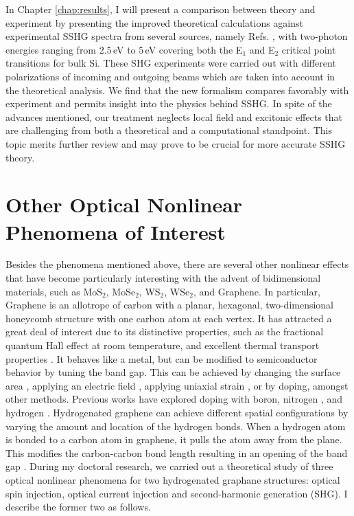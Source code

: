 In Chapter \ref{chap:results}, I will present a comparison between theory and
experiment by presenting the improved theoretical calculations against
experimental SSHG spectra from several sources, namely Refs. \cite{hoferAPA96,
bergfeldPRL04, mejiaPRB02, mitchellSS01}, with two-photon energies ranging from
2.5\,eV to 5\,eV covering both the E$_{1}$ and E$_{2}$ critical point
transitions for bulk Si. These SHG experiments were carried out with different
polarizations of incoming and outgoing beams which are taken into account in the
theoretical analysis. We find that the new formalism compares favorably with
experiment and permits insight into the physics behind SSHG. In spite of the
advances mentioned, our treatment neglects local field and excitonic effects
that are challenging from both a theoretical and a computational standpoint.
This topic merits further review and may prove to be crucial for more accurate
SSHG theory.



\section{Other Optical Nonlinear Phenomena of Interest}

Besides the phenomena mentioned above, there are several other nonlinear effects
that have become particularly interesting with the advent of bidimensional
materials, such as MoS$_{2}$, MoSe$_{2}$, WS$_{2}$, WSe$_{2}$, and Graphene.
In particular, Graphene is an allotrope of carbon with a planar, hexagonal,
two-dimensional honeycomb structure with one carbon atom at each vertex. It has
attracted a great deal of interest due to its distinctive properties, such as
the fractional quantum Hall effect at room temperature, and excellent thermal
transport properties \cite{geimNM07, reinaNL08, novoselov2S7, balandinNL08}. It
behaves like a metal, but can be modified to semiconductor behavior by tuning
the band gap. This can be achieved by changing the surface area \cite{hanPRL07},
applying an electric field \cite{zhangN09}, applying uniaxial strain
\cite{niACSN08}, or by doping, amongst other methods. Previous works have
explored doping with boron, nitrogen \cite{guoIJ11}, and hydrogen
\cite{eliasS09, guisingerNL09, samarakoonACSN10}. Hydrogenated graphene can
achieve different spatial configurations by varying the amount and location of
the hydrogen bonds. When a hydrogen atom is bonded to a carbon atom in graphene,
it pulls the atom away from the plane. This modifies the carbon-carbon bond
length resulting in an opening of the band gap \cite{eliasS09, boukhvalovPRB08}.
During my doctoral research, we carried out a theoretical study of three optical
nonlinear phenomena for two hydrogenated graphane structures: optical spin
injection, optical current injection and second-harmonic generation (SHG). I
describe the former two as follows.


